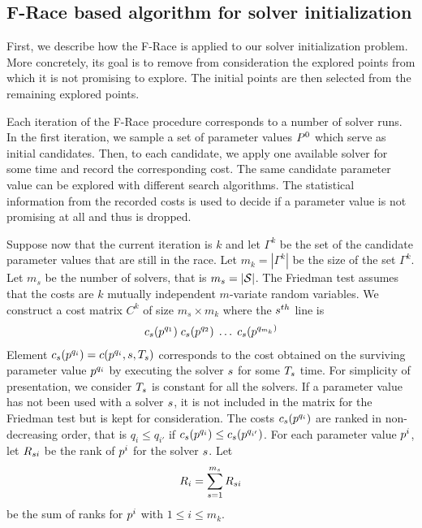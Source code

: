 \subsection{F-Race based algorithm for solver initialization}

First, we describe how the F-Race is applied to our solver initialization problem. More concretely, its goal is to remove from consideration the explored points from which it is not promising to explore. The initial points are then selected from the remaining explored points.

Each iteration of the F-Race procedure corresponds to a number of solver runs. In the first iteration, we sample a set of parameter values $P^0$ which serve as initial candidates. Then, to each candidate, we apply one available solver for some time and record the corresponding cost. The same candidate parameter value can be explored with different search algorithms. The statistical information from the recorded costs is used to decide if a parameter value is not promising at all and thus is dropped. 

Suppose now that the current iteration is $k$ and let $\Gamma^k$ be the set of the candidate parameter values that are still in the race. Let $m_k = | \Gamma^k | $ be the size of the set $\Gamma^k$. Let $m_s$ be the number of solvers, that is $m_s = | \mathcal{S} |$. The Friedman test assumes that the costs are $k$ mutually independent $m$-variate random variables. We construct a cost matrix $C^k$ of size $m_s \times m_k$ where the $s^{th}$ line is
\begin{eqnarray}\label{eq:C}
c_{s}(p^{q_1})  \; c_{s}(p^{q_2}) \; \ldots  \; c_{s}(p^{q_{m_k})} 
\end{eqnarray}
Element $c_{s}(p^{q_i}) = c(p^{q_i}, s, T_{s})$ corresponds to the cost obtained on the surviving parameter value $p^{q_i}$ by executing the solver $s$ for some $T_{s}$ time. For simplicity of presentation, we consider $T_{s}$ is constant for all the solvers. If a parameter value has not been used with a solver $s$, it is not included in the matrix for the Friedman test but is kept for consideration. The costs $c_{s}(p^{q_i})$ are ranked in non-decreasing order, that is $q_i \le q_{i'}$ if $c_{s}(p^{q_i}) \le c_{s}(p^{q_{i'}})$. For each parameter value $p^i$, let $R_{s i}$ be the rank of $p^i$ for the solver $s$. Let $$R_i =  \sum_{s=1}^{m_s} R_{{s} i}$$ 
be the sum of ranks for $p^i$ with $1 \leq i \leq m_k$. 

